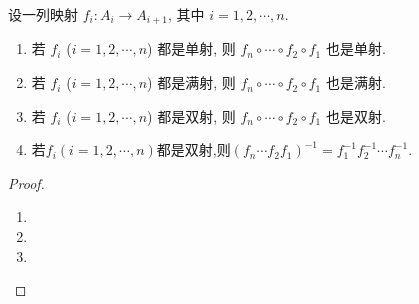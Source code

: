 \documentclass[../../main.tex]{subfiles}%
\begin{document}
\begin{proposition}\label{proposition:映射的复合保持单射、满射和双射}
设一列映射 $f_i:A_i\rightarrow A_{i + 1}$, 其中 $i = 1, 2, \cdots, n$.
\begin{enumerate}[(1)]
\item 若 $f_i$ ($i = 1, 2, \cdots, n$) 都是单射, 则 $f_n\circ \cdots \circ f_2\circ f_1$ 也是单射.

\item 若 $f_i$ ($i = 1, 2, \cdots, n$) 都是满射, 则 $f_n\circ \cdots \circ f_2\circ f_1$ 也是满射.

\item 若 $f_i$ ($i = 1, 2, \cdots, n$) 都是双射, 则 $f_n\circ \cdots \circ f_2\circ f_1$ 也是双射.

\item 若$f_i(i=1,2,\cdots,n)$都是双射,则$(f_n\cdots f_2f_1)^{-1}=f_1^{-1}f_2^{-1}\cdots f_n^{-1}$.
\end{enumerate} 
\end{proposition}
\begin{proof}
\begin{enumerate}[(1)]
\item 

\item 

\item 
\end{enumerate}

\end{proof}
\end{document}

